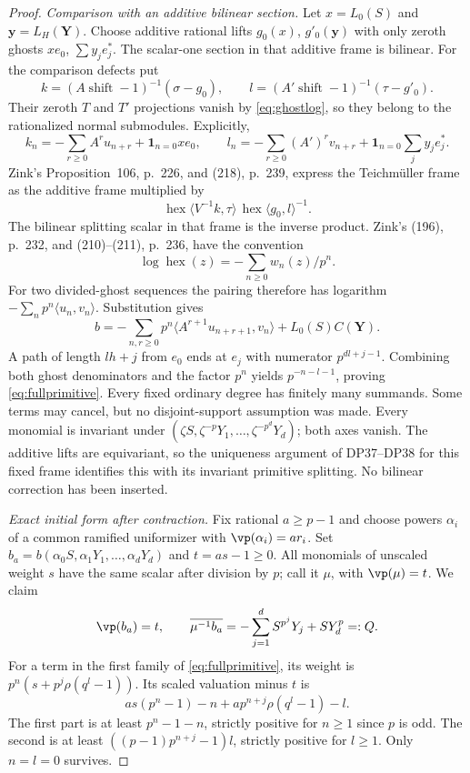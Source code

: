 \begin{proof}
\emph{Comparison with an additive bilinear section.}
Let $x=L_0(S)$ and $\mathbf y=L_H(\mathbf Y)$. Choose additive rational lifts $g_0(x)$, $g'_0(\mathbf y)$ with only zeroth ghosts $xe_0$, $\sum y_je_j^*$. The scalar-one section in that additive frame is bilinear. For the comparison defects put
\[
 k=(A\operatorname{shift}-1)^{-1}(\sigma-g_0),\qquad
 l=(A'\operatorname{shift}-1)^{-1}(\tau-g'_0).
\]
Their zeroth $T$ and $T'$ projections vanish by \eqref{eq:ghostlog}, so they belong to the rationalized normal submodules. Explicitly,
\[
 k_n=-\sum_{r\ge0}A^ru_{n+r}+\mathbf1_{n=0}xe_0,\qquad
 l_n=-\sum_{r\ge0}(A')^rv_{n+r}
                 +\mathbf1_{n=0}\sum_jy_je_j^*.
\]
Zink's Proposition~106, p.~226, and (218), p.~239, express the Teichm\"uller frame as the additive frame multiplied by
\[
 \operatorname{hex}\langle V^{-1}k,\tau\rangle\,
 \operatorname{hex}\langle g_0,l\rangle^{-1}.
\]
The bilinear splitting scalar in that frame is the inverse product. Zink's (196), p.~232, and (210)--(211), p.~236, have the convention
\[
 \log\operatorname{hex}(z)=-\sum_{n\ge0}w_n(z)/p^n.
\]
For two divided-ghost sequences the pairing therefore has logarithm
$-\sum_np^n\langle u_n,v_n\rangle$. Substitution gives
\[
 b=-\sum_{n,r\ge0}p^n\langle A^{r+1}u_{n+r+1},v_n\rangle
          +L_0(S)C(\mathbf Y).
\]
A path of length $lh+j$ from $e_0$ ends at $e_j$ with numerator $p^{dl+j-1}$. Combining both ghost denominators and the factor $p^n$ yields $p^{-n-l-1}$, proving \eqref{eq:fullprimitive}. Every fixed ordinary degree has finitely many summands. Some terms may cancel, but no disjoint-support assumption was made. Every monomial is invariant under
$(\zeta S,\zeta^{-p}Y_1,\ldots,\zeta^{-p^d}Y_d)$; both axes vanish. The additive lifts are equivariant, so the uniqueness argument of DP37--DP38 for this fixed frame identifies this with its invariant primitive splitting. No bilinear correction has been inserted.

\emph{Exact initial form after contraction.}
Fix rational $a\ge p-1$ and choose powers $\alpha_i$ of a common ramified uniformizer with $\vp(\alpha_i)=ar_i$. Set
$b_a=b(\alpha_0S,\alpha_1Y_1,\ldots,\alpha_dY_d)$ and $t=as-1\ge0$.
All monomials of unscaled weight $s$ have the same scalar after division by $p$; call it $\mu$, with $\vp(\mu)=t$. We claim
\begin{equation}\label{eq:primitiveinitial}
 \vp(b_a)=t,\qquad
 \overline{\mu^{-1}b_a}
       =-\sum_{j=1}^dS^{p^j}Y_j+SY_d^p=:Q.
\end{equation}
For a term in the first family of \eqref{eq:fullprimitive}, its weight is
$p^n(s+p^j\rho(q^l-1))$. Its scaled valuation minus $t$ is
\[
 as(p^n-1)-n+a p^{n+j}\rho(q^l-1)-l.
\]
The first part is at least $p^n-1-n$, strictly positive for $n\ge1$ since $p$ is odd. The second is at least $((p-1)p^{n+j}-1)l$, strictly positive for $l\ge1$. Only $n=l=0$ survives.


\end{proof}
